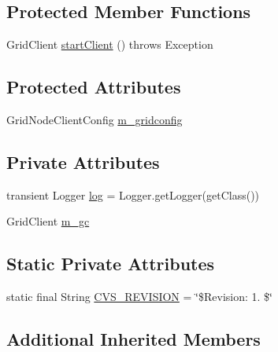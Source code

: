 \subsection*{Protected Member Functions}
\begin{DoxyCompactItemize}
\item 
Grid\-Client \hyperlink{classorg_1_1jgap_1_1distr_1_1grid_1_1_dummy_grid_client_mediator_a080ac41bf4278214c07055ebcc9060f8}{start\-Client} ()  throws Exception 
\end{DoxyCompactItemize}
\subsection*{Protected Attributes}
\begin{DoxyCompactItemize}
\item 
Grid\-Node\-Client\-Config \hyperlink{classorg_1_1jgap_1_1distr_1_1grid_1_1_dummy_grid_client_mediator_a294d251a49d05182f184199b1b5e28bd}{m\-\_\-gridconfig}
\end{DoxyCompactItemize}
\subsection*{Private Attributes}
\begin{DoxyCompactItemize}
\item 
transient Logger \hyperlink{classorg_1_1jgap_1_1distr_1_1grid_1_1_dummy_grid_client_mediator_a5b46671cbe448716a12f21528a01cd9e}{log} = Logger.\-get\-Logger(get\-Class())
\item 
Grid\-Client \hyperlink{classorg_1_1jgap_1_1distr_1_1grid_1_1_dummy_grid_client_mediator_ae5b4466541aa576166f1004920f5b29f}{m\-\_\-gc}
\end{DoxyCompactItemize}
\subsection*{Static Private Attributes}
\begin{DoxyCompactItemize}
\item 
static final String \hyperlink{classorg_1_1jgap_1_1distr_1_1grid_1_1_dummy_grid_client_mediator_a894855d63dd785d9b523712f9eee9770}{C\-V\-S\-\_\-\-R\-E\-V\-I\-S\-I\-O\-N} = \char`\"{}\$Revision\-: 1. \$\char`\"{}
\end{DoxyCompactItemize}
\subsection*{Additional Inherited Members}


